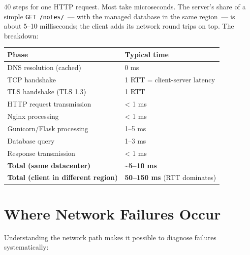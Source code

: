 \noindent{}40 steps for one HTTP request. Most take microseconds. The server's share of a simple \texttt{GET\ /notes/}~--- with the managed database in the same region~--- is about 5--10 milliseconds; the client adds its network round trips on top. The breakdown:


{\def\LTcaptype{none} %
\begin{longtable}[]{@{}ll@{}}
\toprule\noalign{}
Phase & Typical time \\
\midrule\noalign{}
\endhead
\bottomrule\noalign{}
\endlastfoot
DNS resolution (cached) & 0 ms \\
TCP handshake & 1 RTT = client-server latency \\
TLS handshake (TLS 1.3) & 1 RTT \\
HTTP request transmission & \textless{} 1 ms \\
Nginx processing & \textless{} 1 ms \\
Gunicorn/Flask processing & 1--5 ms \\
Database query & 1--3 ms \\
Response transmission & \textless{} 1 ms \\
\textbf{Total (same datacenter)} & \textbf{\textasciitilde5--10 ms} \\
\textbf{Total (client in different region)} & \textbf{50--150 ms} (RTT dominates) \\
\end{longtable}
}

\setcounter{section}{7}
\section{Where Network Failures Occur}\label{26-network-stack-flow:268-where-network-failures-occur}

Understanding the network path makes it possible to diagnose failures systematically:

